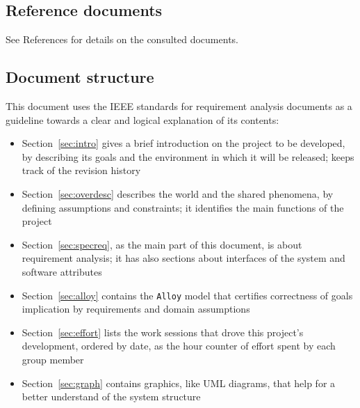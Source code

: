   \subsection{Reference documents}

    See References for details on the consulted documents.

  \subsection{Document structure}

    This document uses the IEEE standards for requirement analysis documents \cite{ieee830} as a guideline towards a clear and logical explanation of its contents:
    \begin{itemize}
      \item Section~\ref{sec:intro} gives a brief introduction on the project to be developed, by describing its goals and the environment in which it will be released; keeps track of the revision history
      \item Section~\ref{sec:overdesc} describes the world and the shared phenomena, by defining assumptions and constraints; it identifies the main functions of the project
      \item Section~\ref{sec:specreq}, as the main part of this document, is about requirement analysis; it has also sections about interfaces of the system and software attributes
      \item Section~\ref{sec:alloy} contains the \texttt{Alloy} model that certifies correctness of goals implication by requirements and domain assumptions
      \item Section~\ref{sec:effort} lists the work sessions that drove this project's development, ordered by date, as the hour counter of effort spent by each group member
      \item Section~\ref{sec:graph} contains graphics, like UML diagrams, that help for a better understand of the system structure
    \end{itemize}
